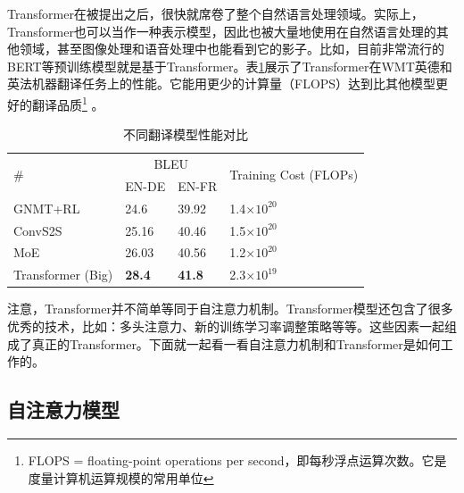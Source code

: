 \parinterval Transformer在被提出之后，很快就席卷了整个自然语言处理领域。实际上，Transformer也可以当作一种表示模型，因此也被大量地使用在自然语言处理的其他领域，甚至图像处理和语音处理中也能看到它的影子。比如，目前非常流行的BERT等预训练模型就是基于Transformer。表\ref{tab:6-12}展示了Transformer在WMT英德和英法机器翻译任务上的性能。它能用更少的计算量（FLOPS）达到比其他模型更好的翻译品质\footnote{FLOPS = floating-point operations per second，即每秒浮点运算次数。它是度量计算机运算规模的常用单位} 。

\begin{table}[htp]
\centering
\caption{ 不同翻译模型性能对比\cite{NIPS2017_7181}}
\label{tab:6-12}
\begin{tabular}{l l l l}
\multicolumn{1}{l|}{\multirow{2}{*}{\#}} & \multicolumn{2}{c}{BLEU} & \multirow{2}{*}{\parbox{6em}{Training Cost (FLOPs)}} \\
\multicolumn{1}{l|}{}                    & EN-DE  & EN-FR  &                                       \\ \hline
\multicolumn{1}{l|}{GNMT+RL}             & 24.6            & 39.92           & 1.4$\times 10^{20}$                   \\
\multicolumn{1}{l|}{ConvS2S}             & 25.16           & 40.46           & 1.5$\times 10^{20}$                   \\
\multicolumn{1}{l|}{MoE}                 & 26.03           & 40.56           & 1.2$\times 10^{20}$                   \\
\multicolumn{1}{l|}{Transformer (Big)}    & {\small\sffamily\bfseries{28.4}}   & {\small\sffamily\bfseries{41.8}}   & 2.3$\times 10^{19}$                   \\
\end{tabular}
\end{table}

\parinterval 注意，Transformer并不简单等同于自注意力机制。Transformer模型还包含了很多优秀的技术，比如：多头注意力、新的训练学习率调整策略等等。这些因素一起组成了真正的Transformer。下面就一起看一看自注意力机制和Transformer是如何工作的。


\subsection{自注意力模型}
\label{sec:6.4.1}

